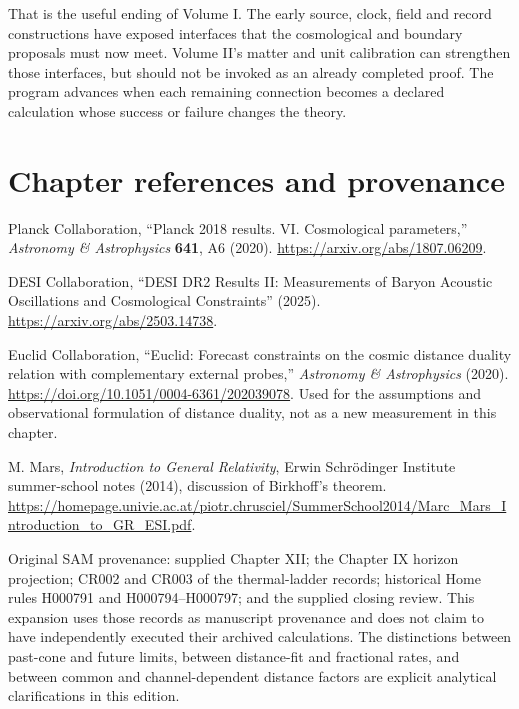 That is the useful ending of Volume I. The early source, clock, field and record constructions have exposed interfaces that the cosmological and boundary proposals must now meet. Volume II's matter and unit calibration can strengthen those interfaces, but should not be invoked as an already completed proof. The program advances when each remaining connection becomes a declared calculation whose success or failure changes the theory.

\section*{Chapter references and provenance}
\begin{enumerate}[label={\textnormal{[XII.\arabic*]}}]
\item Planck Collaboration, ``Planck 2018 results. VI. Cosmological parameters,'' \emph{Astronomy \& Astrophysics} \textbf{641}, A6 (2020). \url{https://arxiv.org/abs/1807.06209}.
\item DESI Collaboration, ``DESI DR2 Results II: Measurements of Baryon Acoustic Oscillations and Cosmological Constraints'' (2025). \url{https://arxiv.org/abs/2503.14738}.
\item Euclid Collaboration, ``Euclid: Forecast constraints on the cosmic distance duality relation with complementary external probes,'' \emph{Astronomy \& Astrophysics} (2020). \url{https://doi.org/10.1051/0004-6361/202039078}. Used for the assumptions and observational formulation of distance duality, not as a new measurement in this chapter.
\item M. Mars, \emph{Introduction to General Relativity}, Erwin Schr\"odinger Institute summer-school notes (2014), discussion of Birkhoff's theorem. \url{https://homepage.univie.ac.at/piotr.chrusciel/SummerSchool2014/Marc_Mars_Introduction_to_GR_ESI.pdf}.
\end{enumerate}
Original SAM provenance: supplied Chapter XII; the Chapter IX horizon projection; CR002 and CR003 of the thermal-ladder records; historical Home rules H000791 and H000794--H000797; and the supplied closing review. This expansion uses those records as manuscript provenance and does not claim to have independently executed their archived calculations. The distinctions between past-cone and future limits, between distance-fit and fractional rates, and between common and channel-dependent distance factors are explicit analytical clarifications in this edition.
